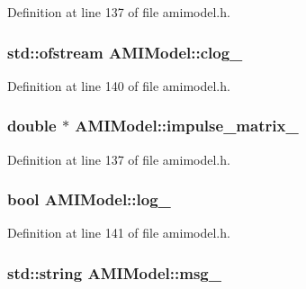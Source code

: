 Definition at line 137 of file amimodel.\+h.

\hypertarget{class_a_m_i_model_a9b1c44767e4e81c4dfcff9bc23907b6c}{}
\subsubsection[{clog\+\_\+}]{\setlength{\rightskip}{0pt plus 5cm}std\+::ofstream A\+M\+I\+Model\+::clog\+\_\+\hspace{0.3cm}{\ttfamily [protected]}}\label{class_a_m_i_model_a9b1c44767e4e81c4dfcff9bc23907b6c}


Definition at line 140 of file amimodel.\+h.

\hypertarget{class_a_m_i_model_a26c35bff12c048655bdbd8663a2f0f58}{}
\subsubsection[{impulse\+\_\+matrix\+\_\+}]{\setlength{\rightskip}{0pt plus 5cm}double $\ast$ A\+M\+I\+Model\+::impulse\+\_\+matrix\+\_\+\hspace{0.3cm}{\ttfamily [protected]}}\label{class_a_m_i_model_a26c35bff12c048655bdbd8663a2f0f58}


Definition at line 137 of file amimodel.\+h.

\hypertarget{class_a_m_i_model_ae701c08f6c4b0d962df4a2f2dcb6196b}{}
\subsubsection[{log\+\_\+}]{\setlength{\rightskip}{0pt plus 5cm}bool A\+M\+I\+Model\+::log\+\_\+\hspace{0.3cm}{\ttfamily [protected]}}\label{class_a_m_i_model_ae701c08f6c4b0d962df4a2f2dcb6196b}


Definition at line 141 of file amimodel.\+h.

\hypertarget{class_a_m_i_model_acc9d4703088b0a69f649c84a1e134cfd}{}
\subsubsection[{msg\+\_\+}]{\setlength{\rightskip}{0pt plus 5cm}std\+::string A\+M\+I\+Model\+::msg\+\_\+\hspace{0.3cm}{\ttfamily [protected]}}\label{class_a_m_i_model_acc9d4703088b0a69f649c84a1e134cfd}


